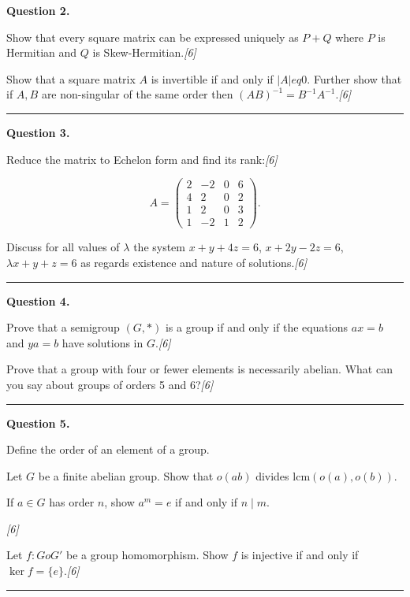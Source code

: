 \documentclass[11pt,a4paper]{article}
\newcommand{\pts}[1]{\hfill   \textit{[#1]}}
\begin{document}
\medskip


\noindent   \textbf{Question 2.}

\begin{parts}
  \item Show that every square matrix can be expressed uniquely as $P+Q$ where $P$ is Hermitian and $Q$ is Skew-Hermitian.\pts{6}
  \item Show that a square matrix $A$ is invertible if and only if $|A|
eq0$. Further show that if $A,B$ are non-singular of the same order then $(AB)^{-1}=B^{-1}A^{-1}$.\pts{6}
\end{parts}
\medskip\rule{\linewidth}{0.2pt}

\medskip


\noindent   \textbf{Question 3.}

\begin{parts}
  \item Reduce the matrix to Echelon form and find its rank:\pts{6}

    \leavevmode\[
      A = 
\begin{pmatrix} 2 & -2 & 0 & 6 \\ 4 & 2 & 0 & 2 \\ 1 & 2 & 0 & 3 \\ 1 & -2 & 1 & 2 \end{pmatrix}.
    \]
  \item Discuss for all values of $\lambda$ the system $x+y+4z=6$, $x+2y-2z=6$, $\lambda x+y+z=6$ as regards existence and nature of solutions.\pts{6}
\end{parts}
\medskip\rule{\linewidth}{0.2pt}

\medskip


\noindent   \textbf{Question 4.}

\begin{parts}
  \item Prove that a semigroup $(G,*)$ is a group if and only if the equations $ax=b$ and $ya=b$ have solutions in $G$.\pts{6}
  \item Prove that a group with four or fewer elements is necessarily abelian. What can you say about groups of orders 5 and 6?\pts{6}
\end{parts}
\medskip\rule{\linewidth}{0.2pt}

\medskip


\noindent   \textbf{Question 5.}

\begin{parts}
  \item Define the order of an element of a group.
    
\begin{parts}
      \item Let $G$ be a finite abelian group. Show that $o(ab)$ divides $\mathrm{lcm}(o(a),o(b))$.
      \item If $a\in G$ has order $n$, show $a^m=e$ if and only if $n\mid m$.
    \end{parts}\pts{6}
  \item Let $f:G o G'$ be a group homomorphism. Show $f$ is injective if and only if $\ker f=\{e\}$.\pts{6}
\end{parts}
\medskip\rule{\linewidth}{0.2pt}
\end{document}
